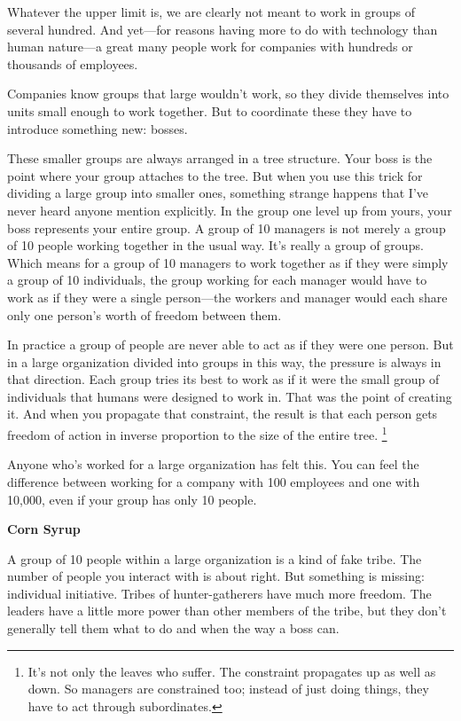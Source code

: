 Whatever the upper limit is, we are clearly not meant to work in groups
of several hundred. And yet---for reasons having more to do with
technology than human nature---a great many people work for companies
with hundreds or thousands of employees.

Companies know groups that large wouldn't work, so they divide
themselves into units small enough to work together. But to coordinate
these they have to introduce something new: bosses.

These smaller groups are always arranged in a tree structure. Your boss
is the point where your group attaches to the tree. But when you use
this trick for dividing a large group into smaller ones, something
strange happens that I've never heard anyone mention explicitly. In the
group one level up from yours, your boss represents your entire group. A
group of 10 managers is not merely a group of 10 people working together
in the usual way. It's really a group of groups. Which means for a group
of 10 managers to work together as if they were simply a group of 10
individuals, the group working for each manager would have to work as if
they were a single person---the workers and manager would each share
only one person's worth of freedom between them.

In practice a group of people are never able to act as if they were one
person. But in a large organization divided into groups in this way, the
pressure is always in that direction. Each group tries its best to work
as if it were the small group of individuals that humans were designed
to work in. That was the point of creating it. And when you propagate
that constraint, the result is that each person gets freedom of action
in inverse proportion to the size of the entire tree.
\footnote{It's not only the leaves who suffer. The constraint propagates
up as well as down. So managers are constrained too; instead of just
doing things, they have to act through subordinates.}

Anyone who's worked for a large organization has felt this. You can feel
the difference between working for a company with 100 employees and one
with 10,000, even if your group has only 10 people.

\textbf{Corn Syrup}

A group of 10 people within a large organization is a kind of fake
tribe. The number of people you interact with is about right. But
something is missing: individual initiative. Tribes of hunter-gatherers
have much more freedom. The leaders have a little more power than other
members of the tribe, but they don't generally tell them what to do and
when the way a boss can.

